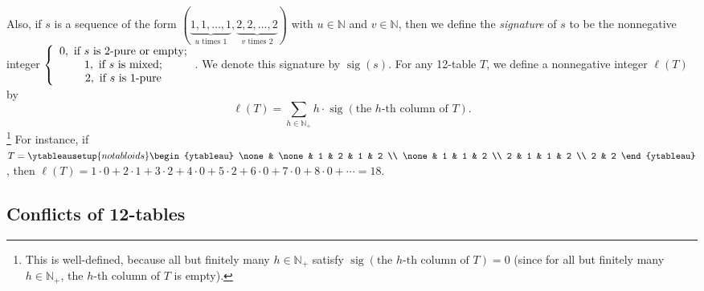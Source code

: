 \documentclass[numbers=enddot,12pt,final,onecolumn,notitlepage]{scrartcl}%
\theoremstyle{definition}
\let\sumnonlimits\sum
\renewcommand{\sum}{\sumnonlimits\limits}
\begin{document}
Also, if $s$ is a sequence of the form $\left(  \underbrace{1,1,\ldots
,1}_{u\text{ times }1},\underbrace{2,2,\ldots,2}_{v\text{ times }2}\right)  $
with $u\in\mathbb{N}$ and $v\in\mathbb{N}$, then we define the
\textit{signature} of $s$ to be the nonnegative integer $\left\{
\begin{array}
[c]{c}%
0,\text{ if }s\text{ is 2-pure or empty;}\\
1,\text{ if }s\text{ is mixed;}\\
2,\text{ if }s\text{ is 1-pure}%
\end{array}
\right.  $. We denote this signature by $\operatorname*{sig}\left(  s\right)
$. For any 12-table $T$, we define a nonnegative integer $\ell\left(
T\right)  $ by%
\[
\ell\left(  T\right)  =\sum_{h\in\mathbb{N}_{+}}h\cdot\operatorname*{sig}%
\left(  \text{the }h\text{-th column of }T\right)  .
\]
\footnote{This is well-defined, because all but finitely many $h\in
\mathbb{N}_{+}$ satisfy $\operatorname*{sig}\left(  \text{the }h\text{-th
column of }T\right)  =0$ (since for all but finitely many $h\in\mathbb{N}_{+}%
$, the $h$-th column of $T$ is empty).} For instance, if $T=%
\ytableausetup{notabloids}
\begin{ytableau}
\none& \none& 1 & 2 & 1 & 2 \\
\none& 1 & 1 & 2 \\
2 & 1 & 1 & 2 \\
2 & 2
\end{ytableau}%
$, then $\ell\left(  T\right)  =1\cdot0+2\cdot1+3\cdot2+4\cdot0+5\cdot
2+6\cdot0+7\cdot0+8\cdot0+\cdots=18$.

\subsection{Conflicts of 12-tables}
\end{document}
